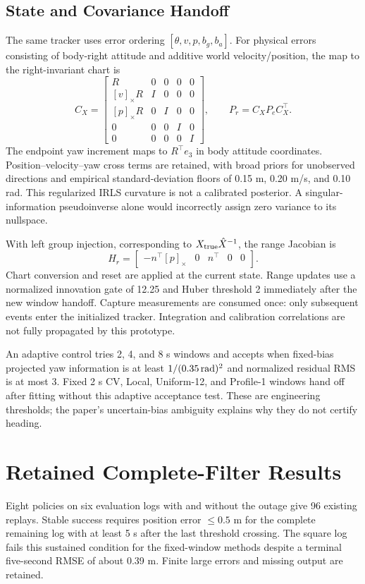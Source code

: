 \documentclass[conference,letterpaper,10pt]{IEEEtran}
\newcommand{\sk}[1]{[#1]_\times}
\begin{document}
\subsection{State and Covariance Handoff}
The same tracker uses error ordering $[\theta,v,p,b_g,b_a]$. For physical errors consisting of body-right attitude and additive world velocity/position, the map to the right-invariant chart is
\begin{equation}
 C_X=\begin{bmatrix}
 R&0&0&0&0\\
 \sk{v}R&I&0&0&0\\
 \sk{p}R&0&I&0&0\\
 0&0&0&I&0\\0&0&0&0&I
 \end{bmatrix},\qquad P_r=C_XP_eC_X^\top .
\end{equation}
The endpoint yaw increment maps to $R^\top e_3$ in body attitude coordinates. Position--velocity--yaw cross terms are retained, with broad priors for unobserved directions and empirical standard-deviation floors of 0.15 m, 0.20 m/s, and 0.10 rad. This regularized IRLS curvature is not a calibrated posterior. A singular-information pseudoinverse alone would incorrectly assign zero variance to its nullspace.

With left group injection, corresponding to $X_{\rm true}\hat X^{-1}$, the range Jacobian is
\begin{equation}
 H_r=\begin{bmatrix}-n^\top\sk{p}&0&n^\top&0&0\end{bmatrix}.
\end{equation}
Chart conversion and reset are applied at the current state. Range updates use a normalized innovation gate of 12.25 and Huber threshold 2 immediately after the new window handoff. Capture measurements are consumed once: only subsequent events enter the initialized tracker. Integration and calibration correlations are not fully propagated by this prototype.

An adaptive control tries 2, 4, and 8 s windows and accepts when fixed-bias projected yaw information is at least $1/(0.35\,{\rm rad})^2$ and normalized residual RMS is at most 3. Fixed 2 s CV, Local, Uniform-12, and Profile-1 windows hand off after fitting without this adaptive acceptance test. These are engineering thresholds; the paper's uncertain-bias ambiguity explains why they do not certify heading.

\section{Retained Complete-Filter Results}
Eight policies on six evaluation logs with and without the outage give 96 existing replays. Stable success requires position error $\le0.5$ m for the complete remaining log with at least 5 s after the last threshold crossing. The square log fails this sustained condition for the fixed-window methods despite a terminal five-second RMSE of about 0.39 m. Finite large errors and missing output are retained.
\end{document}
